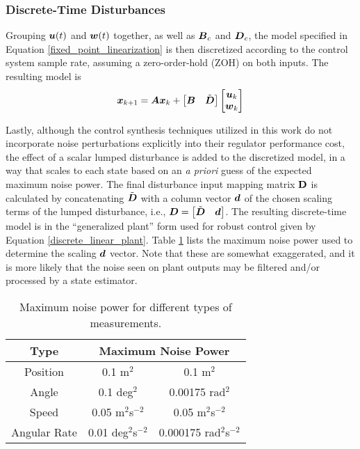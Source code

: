 \subsubsection{Discrete-Time Disturbances}
Grouping $\vb*{u}(t)$ and $\vb*{w}(t)$ together, as well as $\vb*{B}_{c}$ and $\vb*{D}_{c}$, the model specified in Equation \eqref{fixed_point_linearization} is then discretized according to the control system sample rate, assuming a zero-order-hold (ZOH) on both inputs.  The resulting model is
\begin{equation}
\label{fixed_point_linearization_discrete}
\begin{aligned}
	\vb*{x}_{k+1} &= \vb*{A}\vb*{x}_{k} + \begin{bmatrix} \vb*{B} & \tilde{\vb*{D}} \end{bmatrix} \begin{bmatrix} \vb*{u}_{k}\\ \vb*{w}_{k} \end{bmatrix}\\
\end{aligned}
\end{equation}

Lastly, although the control synthesis techniques utilized in this work do not incorporate noise perturbations explicitly into their regulator performance cost, the effect of a scalar lumped disturbance is added to the discretized model, in a way that scales to each state based on an \emph{a priori} guess of the expected maximum noise power.  The final disturbance input mapping matrix $\vb{D}$ is calculated by concatenating $\tilde{\vb*{D}}$ with a column vector $\vb*{d}$ of the chosen scaling terms of the lumped disturbance, i.e., $\vb*{D} = \begin{bmatrix} \tilde{\vb*{D}} & \vb*{d} \end{bmatrix}$.  The resulting discrete-time model is in the ``generalized plant'' form used for robust control given by Equation \eqref{discrete_linear_plant}.  Table \ref{table:max_noise} lists the maximum noise power used to determine the scaling $\vb*{d}$ vector.  Note that these are somewhat exaggerated, and it is more likely that the noise seen on plant outputs may be filtered and/or processed by a state estimator.
\begin{table}[H]
\centering
\caption{Maximum noise power for different types of measurements.}
\begin{tabular}{|c||c|c|}
	\hline
	\textbf{Type} & \multicolumn{2}{c|}{\textbf{Maximum Noise Power}}\\
	\hline
	Position & 0.1 m$^{2}$ & 0.1 m$^{2}$\\
	\hline
	Angle & 0.1 deg$^{2}$ & 0.00175 rad$^{2}$\\
	\hline
	Speed & 0.05 m$^{2}$s$^{-2}$ & 0.05 m$^{2}$s$^{-2}$\\
	\hline
	Angular Rate & 0.01 deg$^{2}$s$^{-2}$ &  0.000175 rad$^{2}$s$^{-2}$\\
	\hline
\end{tabular}
\label{table:max_noise}
\end{table}

